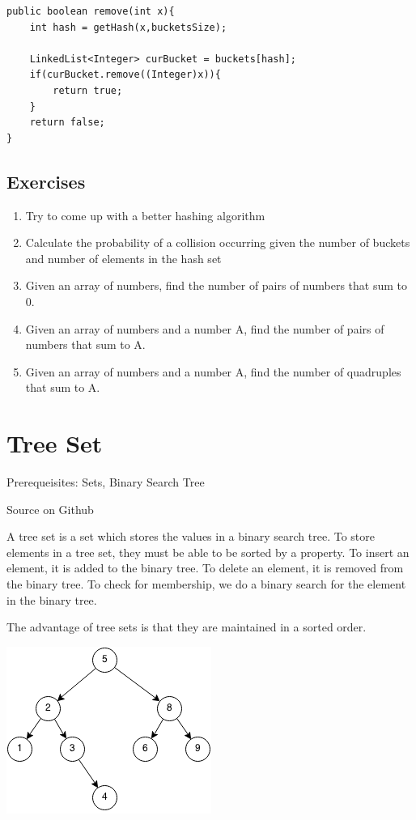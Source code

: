 \documentclass[11pt,oneside]{book}
\makeatletter
\def\maxwidth#1{\ifdim\Gin@nat@width>#1 #1\else\Gin@nat@width\fi}
\makeatother
\begin{document}
\begin{lstlisting}
public boolean remove(int x){
    int hash = getHash(x,bucketsSize);
    
    LinkedList<Integer> curBucket = buckets[hash];
    if(curBucket.remove((Integer)x)){
        return true;
    }
    return false;
}
\end{lstlisting}

\subsection{Exercises}

\begin{enumerate}
\item Try to come up with a better hashing algorithm
\item Calculate the probability of a collision occurring given the number of buckets and number of elements in the hash set
\item Given an array of numbers, find the number of pairs of numbers that sum to 0.
\item Given an array of numbers and a number A, find the number of pairs of numbers that sum to A.
\item Given an array of numbers and a number A, find the number of quadruples that sum to A.
\end{enumerate}
\section{Tree Set}

Prerequeisites: Sets, Binary Search Tree

Source on Github

A tree set is a set which stores the values in a binary search tree. To store elements in a tree set, they must be able to be sorted by a property. To insert an element, it is added to the binary tree. To delete an element, it is removed from the binary tree. To check for membership, we do a binary search for the element in the binary tree.

The advantage of tree sets is that they are maintained in a sorted order.

\includegraphics[width=\maxwidth{\textwidth}]{bst.png}
\end{document}
